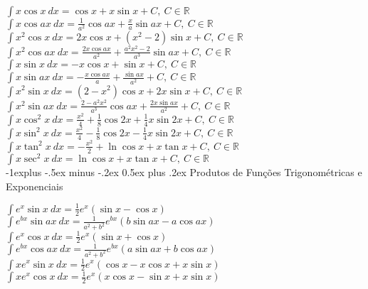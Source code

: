 \documentclass[10pt,landscape]{article}
\makeatletter
\renewcommand{\subsection}{\@startsection{subsection}{2}{0mm}%
                                {-1explus -.5ex minus -.2ex}%
                                {0.5ex plus .2ex}%
                                {\normalfont\normalsize\bfseries}}
\makeatother
\begin{document}
\begin{multicols}{3}
$\int x \cos x \ dx = \cos x + x \sin x + C,\ C \in \mathbb{R}$\\
$\int x \cos ax \ dx = \frac{1}{a^2} \cos ax + \frac{x}{a} \sin ax + C,\ C \in \mathbb{R}$\\
$\int x^2 \cos x \ dx = 2 x \cos x + ( x^2 - 2) \sin x + C,\ C \in \mathbb{R}$\\
$\int x^2 \cos ax \ dx = \frac{2 x \cos ax }{a^2} + \frac{ a^2 x^2 - 2  }{a^3} \sin ax + C,\ C \in \mathbb{R}$\\
$\int x \sin x\ dx = -x \cos x + \sin x + C,\ C \in \mathbb{R}$\\
$\int x \sin ax\ dx = -\frac{x \cos ax}{a} + \frac{\sin ax}{a^2} + C,\ C \in \mathbb{R}$\\
$\int x^2 \sin x\ dx = (2-x^2) \cos x + 2 x \sin x + C,\ C \in \mathbb{R}$\\
$\int x^2 \sin ax\ dx =\frac{2-a^2x^2}{a^3}\cos ax +\frac{ 2 x \sin ax}{a^2} + C,\ C \in \mathbb{R}$\\
$\int x \cos^2 x \ dx = \frac{x^2}{4}+\frac{1}{8}\cos 2x + \frac{1}{4} x \sin 2x + C,\ C \in \mathbb{R}$\\
$\int x \sin^2 x \ dx = \frac{x^2}{4}-\frac{1}{8}\cos 2x - \frac{1}{4} x \sin 2x + C,\ C \in \mathbb{R}$\\
$\int x \tan^2 x \ dx = -\frac{x^2}{2} + \ln \cos x + x \tan x + C,\ C \in \mathbb{R}$\\
$\int x \sec^2 x \ dx = \ln \cos x + x \tan x + C,\ C \in \mathbb{R}$\\

\subsection{Produtos de Funções Trigonométricas e Exponenciais}

$\int e^x \sin x \ dx = \frac{1}{2}e^x (\sin x - \cos x)$\\
$\int e^{bx} \sin ax\ dx = \frac{1}{a^2+b^2}e^{bx} (b\sin ax - a\cos ax)$\\
$\int e^x \cos x\ dx = \frac{1}{2}e^x (\sin x + \cos x)$\\
$\int e^{bx} \cos ax\ dx = \frac{1}{a^2 + b^2} e^{bx} ( a \sin ax + b \cos ax )$\\
$\int x e^x \sin x\ dx = \frac{1}{2}e^x (\cos x - x \cos x + x \sin x)$\\
$\int x e^x \cos x\ dx = \frac{1}{2}e^x (x \cos x - \sin x + x \sin x)$\\




\end{multicols}
\end{document}
